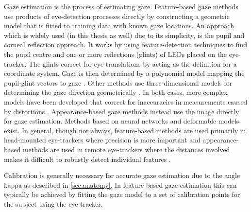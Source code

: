 Gaze estimation is the process of estimating gaze. Feature-based gaze methods use products of eye-detection processes directly by constructing a geometric model that is fitted to training data with known gaze locations. An approach which is widely used (in this thesis as well) due to its simplicity, is the pupil and corneal reflection approach. It works by using feature-detection techniques to find the pupil centre and one or more reflections (glints) of LEDs placed on the eye-tracker. The glints correct for eye translations by acting as the definition for a coordinate system. Gaze is then determined by a polynomial model mapping the pupil-glint vectors to gaze \parencite{hansen2009eye}. Other methods use three-dimensional models for determining the gaze direction geometrically \parencite{hansen2009eye}. In both cases, more complex models have been developed that correct for inaccuracies in measurements caused by distortions \parencite{hansen2009eye}. Appearance-based gaze methods instead use the image directly for gaze estimation. Methods based on neural networks and deformable models exist. In general, though not always, feature-based methods are used primarily in head-mounted eye-trackers where precision is more important and appearance-based methods are used in remote eye-trackers where the distances involved makes it difficult to robustly detect individual features \parencite{hansen2009eye}.

Calibration is generally necessary for accurate gaze estimation due to the angle kappa as described in \cref{sec:anatomy}. In feature-based gaze estimation this can typically be achieved by fitting the gaze model to a set of calibration points for the subject using the eye-tracker.





